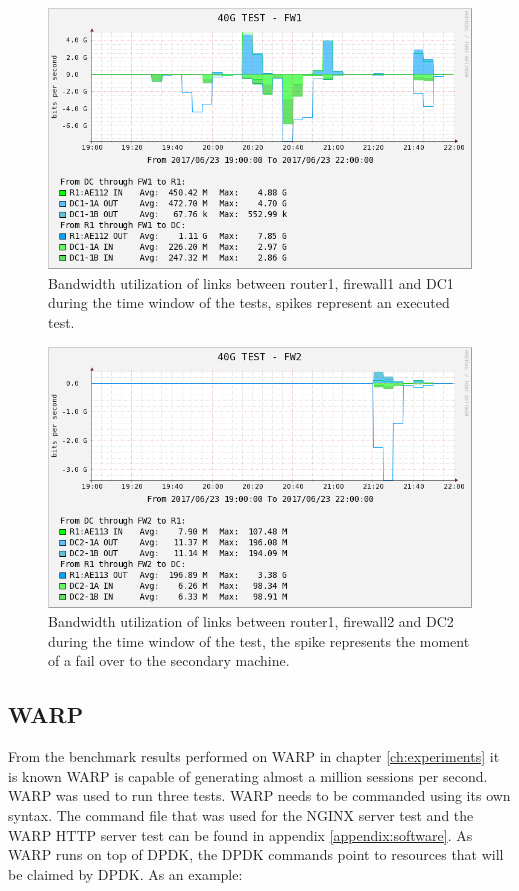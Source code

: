 \begin{figure}[H]
  \includegraphics[scale=0.5]{images/real-ae112.png}
  \caption{Bandwidth utilization of links between router1, firewall1 and DC1 during the time window of the tests, spikes represent an executed test.}
  \label{fig:testrealusageae112}
\end{figure}

\begin{figure}[H]
  \includegraphics[scale=0.5]{images/real-ae113.png}
  \caption{Bandwidth utilization of links between router1, firewall2 and DC2 during the time window of the test, the spike represents the moment of a fail over to the secondary machine.}
  \label{fig:testrealusageae113}
\end{figure}




\subsection{WARP}
From the benchmark results performed on WARP in chapter \ref{ch:experiments} it is known WARP is capable of generating almost a million sessions per second. 
WARP was used to run three tests. WARP needs to be commanded using its own syntax. The command file that was used for the NGINX server test and the WARP HTTP server test can be found in appendix \ref{appendix:software}. As WARP runs on top of DPDK, the DPDK commands point to resources that will be claimed by DPDK. As an example:

